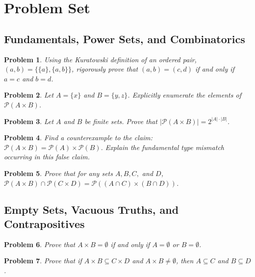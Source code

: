 \documentclass[11pt]{article}
\newtheorem{problem}{Problem}
\begin{document}
\newpage

\section{Problem Set}
\label{sec:problems}

\subsection{Fundamentals, Power Sets, and Combinatorics}
\begin{problem}
Using the Kuratowski definition of an ordered pair, $(a, b) = \{\{a\}, \{a, b\}\}$, rigorously prove that $(a, b) = (c, d)$ if and only if $a = c$ and $b = d$.
\end{problem}

\begin{problem}
Let $A = \{x\}$ and $B = \{y, z\}$. Explicitly enumerate the elements of $\mathcal{P}(A \times B)$.
\end{problem}

\begin{problem}
Let $A$ and $B$ be finite sets. Prove that $|\mathcal{P}(A \times B)| = 2^{|A| \cdot |B|}$.
\end{problem}

\begin{problem}
Find a counterexample to the claim: $\mathcal{P}(A \times B) = \mathcal{P}(A) \times \mathcal{P}(B)$. Explain the fundamental type mismatch occurring in this false claim.
\end{problem}

\begin{problem}
Prove that for any sets $A, B, C,$ and $D$, $\mathcal{P}(A \times B) \cap \mathcal{P}(C \times D) = \mathcal{P}((A \cap C) \times (B \cap D))$.
\end{problem}

\subsection{Empty Sets, Vacuous Truths, and Contrapositives}
\begin{problem}
Prove that $A \times B = \emptyset$ if and only if $A = \emptyset$ or $B = \emptyset$.
\end{problem}

\begin{problem}
Prove that if $A \times B \subseteq C \times D$ and $A \times B \neq \emptyset$, then $A \subseteq C$ and $B \subseteq D$.
\end{problem}
\end{document}
